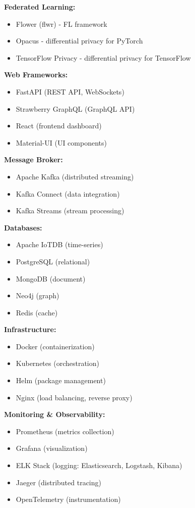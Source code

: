 \documentclass[12pt,a4paper]{article}
\begin{document}
\textbf{Federated Learning:}
\begin{itemize}[leftmargin=1cm,itemsep=0pt]
    \item Flower (flwr) - FL framework
    \item Opacus - differential privacy for PyTorch
    \item TensorFlow Privacy - differential privacy for TensorFlow
\end{itemize}

\textbf{Web Frameworks:}
\begin{itemize}[leftmargin=1cm,itemsep=0pt]
    \item FastAPI (REST API, WebSockets)
    \item Strawberry GraphQL (GraphQL API)
    \item React (frontend dashboard)
    \item Material-UI (UI components)
\end{itemize}

\textbf{Message Broker:}
\begin{itemize}[leftmargin=1cm,itemsep=0pt]
    \item Apache Kafka (distributed streaming)
    \item Kafka Connect (data integration)
    \item Kafka Streams (stream processing)
\end{itemize}

\textbf{Databases:}
\begin{itemize}[leftmargin=1cm,itemsep=0pt]
    \item Apache IoTDB (time-series)
    \item PostgreSQL (relational)
    \item MongoDB (document)
    \item Neo4j (graph)
    \item Redis (cache)
\end{itemize}

\textbf{Infrastructure:}
\begin{itemize}[leftmargin=1cm,itemsep=0pt]
    \item Docker (containerization)
    \item Kubernetes (orchestration)
    \item Helm (package management)
    \item Nginx (load balancing, reverse proxy)
\end{itemize}

\textbf{Monitoring \& Observability:}
\begin{itemize}[leftmargin=1cm,itemsep=0pt]
    \item Prometheus (metrics collection)
    \item Grafana (visualization)
    \item ELK Stack (logging: Elasticsearch, Logstash, Kibana)
    \item Jaeger (distributed tracing)
    \item OpenTelemetry (instrumentation)
\end{itemize}
\end{document}
